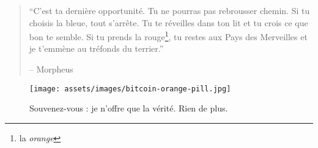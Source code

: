 \begin{quotation}\begin{samepage}
\enquote{C'est ta dernière opportunité. Tu ne pourras pas rebrousser chemin. Si
tu choisis la bleue, tout s'arrête. Tu te réveilles dans ton lit et tu crois ce
que bon te semble. Si tu prends la rouge\footnote{la \textit{orange}}, tu restes
aux Pays des Merveilles et je t'emmène au tréfonds du terrier.}
\begin{flushright} -- Morpheus
\end{flushright}\end{samepage}\end{quotation}

\begin{figure}
  \texttt{[image: assets/images/bitcoin-orange-pill.jpg]}
  \caption*{Souvenez-vous : je n'offre que la vérité. Rien de plus.}
  \label{fig:bitcoin-orange-pill}
\end{figure}

%
%
%

